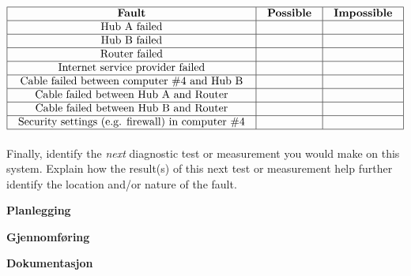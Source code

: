 \begin{enumerate}
$$\vbox{\offinterlineskip
\halign{\strut
\vrule \quad\hfil # \ \hfil & 
\vrule \quad\hfil # \ \hfil & 
\vrule \quad\hfil # \ \hfil \vrule \cr
\noalign{\hrule}
%
{\bf Fault} & {\bf Possible} & {\bf Impossible} \cr
%
\noalign{\hrule}
%
Hub A failed &  &  \cr
%
\noalign{\hrule}
%
Hub B failed &  &  \cr
%
\noalign{\hrule}
%
Router failed &  &  \cr
%
\noalign{\hrule}
%
Internet service provider failed &  &  \cr
%
\noalign{\hrule}
%
Cable failed between computer \#4 and Hub B &  &  \cr
%
\noalign{\hrule}
%
Cable failed between Hub A and Router &  &  \cr
%
\noalign{\hrule}
%
Cable failed between Hub B and Router &  &  \cr
%
\noalign{\hrule}
%
Security settings (e.g. firewall) in computer \#4 &  &  \cr
%
\noalign{\hrule}
} %
}$$ %

Finally, identify the {\it next} diagnostic test or measurement you would make on this system.  Explain how the result(s) of this next test or measurement help further identify the location and/or nature of the fault.

\end{enumerate}


\textbf{Planlegging}

\textbf{Gjennomføring}

\textbf{Dokumentasjon}

















\vfil \eject

















